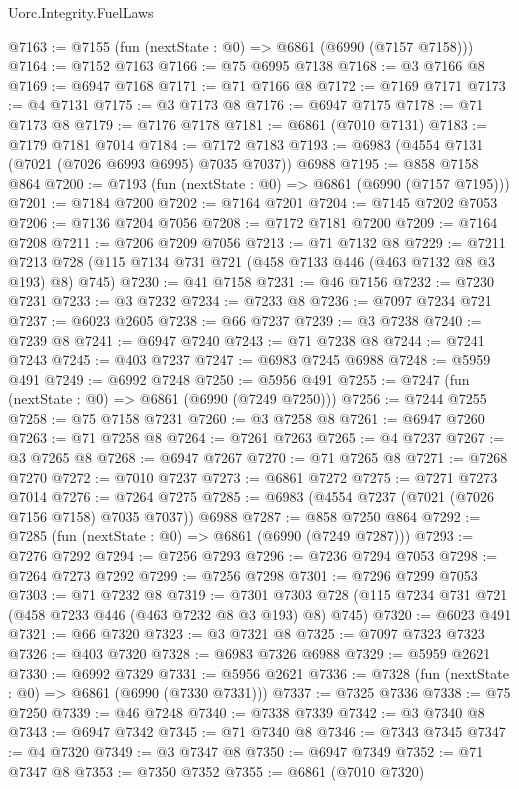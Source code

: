 \begin{lexlean}{Uorc.Integrity.FuelLaws}
\begin{coremodule}
@7163 := @7155 (fun (nextState : @0) => @6861 (@6990 (@7157 @7158)))
@7164 := @7152 @7163
@7166 := @75 @6995 @7138
@7168 := @3 @7166 @8
@7169 := @6947 @7168
@7171 := @71 @7166 @8
@7172 := @7169 @7171
@7173 := @4 @7131
@7175 := @3 @7173 @8
@7176 := @6947 @7175
@7178 := @71 @7173 @8
@7179 := @7176 @7178
@7181 := @6861 (@7010 @7131)
@7183 := @7179 @7181 @7014
@7184 := @7172 @7183
@7193 := @6983 (@4554 @7131 (@7021 (@7026 @6993 @6995) @7035 @7037)) @6988
@7195 := @858 @7158 @864
@7200 := @7193 (fun (nextState : @0) => @6861 (@6990 (@7157 @7195)))
@7201 := @7184 @7200
@7202 := @7164 @7201
@7204 := @7145 @7202 @7053
@7206 := @7136 @7204 @7056
@7208 := @7172 @7181 @7200
@7209 := @7164 @7208
@7211 := @7206 @7209 @7056
@7213 := @71 @7132 @8
@7229 := @7211 @7213 @728 (@115 @7134 @731 @721 (@458 @7133 @446 (@463 @7132 @8 @3 @193) @8) @745)
@7230 := @41 @7158
@7231 := @46 @7156
@7232 := @7230 @7231
@7233 := @3 @7232
@7234 := @7233 @8
@7236 := @7097 @7234 @721
@7237 := @6023 @2605
@7238 := @66 @7237
@7239 := @3 @7238
@7240 := @7239 @8
@7241 := @6947 @7240
@7243 := @71 @7238 @8
@7244 := @7241 @7243
@7245 := @403 @7237
@7247 := @6983 @7245 @6988
@7248 := @5959 @491
@7249 := @6992 @7248
@7250 := @5956 @491
@7255 := @7247 (fun (nextState : @0) => @6861 (@6990 (@7249 @7250)))
@7256 := @7244 @7255
@7258 := @75 @7158 @7231
@7260 := @3 @7258 @8
@7261 := @6947 @7260
@7263 := @71 @7258 @8
@7264 := @7261 @7263
@7265 := @4 @7237
@7267 := @3 @7265 @8
@7268 := @6947 @7267
@7270 := @71 @7265 @8
@7271 := @7268 @7270
@7272 := @7010 @7237
@7273 := @6861 @7272
@7275 := @7271 @7273 @7014
@7276 := @7264 @7275
@7285 := @6983 (@4554 @7237 (@7021 (@7026 @7156 @7158) @7035 @7037)) @6988
@7287 := @858 @7250 @864
@7292 := @7285 (fun (nextState : @0) => @6861 (@6990 (@7249 @7287)))
@7293 := @7276 @7292
@7294 := @7256 @7293
@7296 := @7236 @7294 @7053
@7298 := @7264 @7273 @7292
@7299 := @7256 @7298
@7301 := @7296 @7299 @7053
@7303 := @71 @7232 @8
@7319 := @7301 @7303 @728 (@115 @7234 @731 @721 (@458 @7233 @446 (@463 @7232 @8 @3 @193) @8) @745)
@7320 := @6023 @491
@7321 := @66 @7320
@7323 := @3 @7321 @8
@7325 := @7097 @7323 @7323
@7326 := @403 @7320
@7328 := @6983 @7326 @6988
@7329 := @5959 @2621
@7330 := @6992 @7329
@7331 := @5956 @2621
@7336 := @7328 (fun (nextState : @0) => @6861 (@6990 (@7330 @7331)))
@7337 := @7325 @7336
@7338 := @75 @7250
@7339 := @46 @7248
@7340 := @7338 @7339
@7342 := @3 @7340 @8
@7343 := @6947 @7342
@7345 := @71 @7340 @8
@7346 := @7343 @7345
@7347 := @4 @7320
@7349 := @3 @7347 @8
@7350 := @6947 @7349
@7352 := @71 @7347 @8
@7353 := @7350 @7352
@7355 := @6861 (@7010 @7320)

\end{coremodule}
\end{lexlean}
